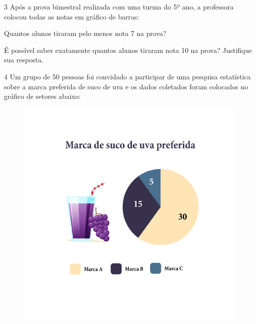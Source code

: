 \num{3} Após a prova bimestral realizada com uma turma do 5º ano, a
professora colocou todas as notas em gráfico de barras:


\begin{escolha}
\item
  Quantos alunos tiraram pelo menos nota 7 na prova?


\item
  É possível saber exatamente quantos alunos tiraram nota 10 na prova?
  Justifique sua resposta.

\end{escolha}


\num{4} Um grupo de 50 pessoas foi convidado a participar de uma pesquisa
estatística sobre a marca preferida de suco de uva e os dados coletados
foram colocados no gráfico de setores abaixo:

\begin{figure}[htpb!]
\includegraphics[width=\textwidth]{../ilustracoes/MAT5/SAEB_5ANO_MAT_figura103.png}
\end{figure}

